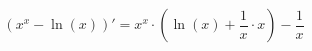 \documentclass[a4paper,12pt]{article}
\begin{document}
$$(x ^{x}  -  \ln (x) )' = x ^{x}  \cdot ( \ln (x)  +  \frac{1}{x}  \cdot x) -  \frac{1}{x} $$
\end{document}
